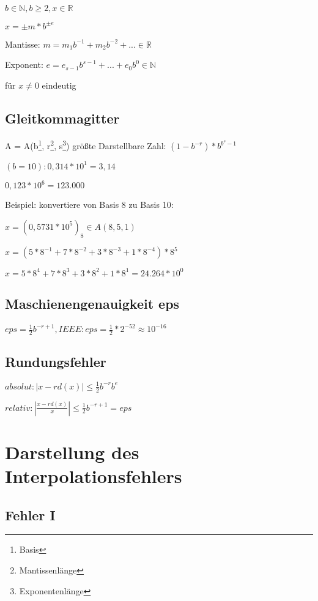 \documentclass[12pt,a4paper]{article} %
\newcommand*\tab[1][1cm]{\hspace*{#1}}
\begin{document}
		$b \in \mathbb{N}, b \ge 2, x \in \mathbb{R}$
		
		$x = \pm m * b^{\pm e}$
		
		Mantisse: $m = m_1b^{-1} + m_2b^{-2} + ... \in \mathbb{R}$
		
		Exponent: $e = e_{s-1}b^{s-1} + ... + e_0b^0 \in \mathbb{N}$
		
		für $x \ne 0$ eindeutig
		
		\subsection{Gleitkommagitter}
		
		A = A(b\footnote{Basis}, r\footnote{Mantissenlänge}, s\footnote{Exponentenlänge}) \tab größte Darstellbare Zahl: $(1 - b^{-r})*b^{b^s-1}$
		
		$(b = 10): 0,314 * 10^1 = 3,14$
		
		$0,123 * 10^6 = 123.000$
		
		Beispiel: konvertiere von Basis 8 zu Basis 10:
		
		$x = (0,5731 * 10^5)_8 \in A(8, 5, 1)$
		
		$x = (5 * 8^{-1} + 7 * 8^{-2} + 3 * 8^{-3} + 1 * 8^{-4}) * 8^5$
		
		$x = 5 * 8^4 + 7 * 8^3 + 3 * 8^2 + 1 * 8^1 = 24.264 * 10^0$
		
		\subsection{Maschienengenauigkeit eps}
		
		$eps = \frac{1}{2}b^{-r + 1}, IEEE: eps = \frac{1}{2} * 2^{-52} \approx 10^{-16}$
		
		\subsection{Rundungsfehler}
		
		$absolut: |x - rd(x)| \le \frac{1}{2}b^{-r}b^e$
		
		$relativ: |\frac{x - rd(x)}{x}| \le \frac{1}{2}b^{-r+1} = eps$
		
		\newpage
		
		\section{Darstellung des Interpolationsfehlers}
		
		\subsection{Fehler I}
		
\end{document}
